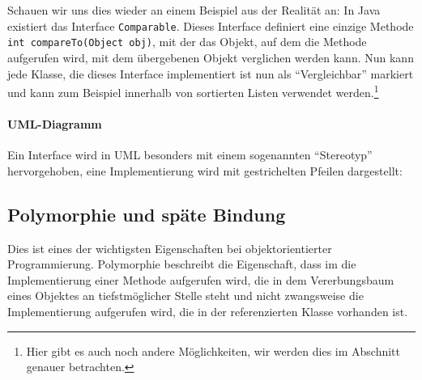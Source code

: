 	Schauen wir uns dies wieder an einem Beispiel aus der Realität an: In Java existiert das Interface \lstinline|Comparable|. Dieses Interface definiert eine einzige Methode \lstinline|int compareTo(Object obj)|, mit der das Objekt, auf dem die Methode aufgerufen wird, mit dem übergebenen Objekt verglichen werden kann. Nun kann jede Klasse, die dieses Interface implementiert ist nun als \enquote{Vergleichbar} markiert und kann zum Beispiel innerhalb von sortierten Listen verwendet werden.\footnote{Hier gibt es auch noch andere Möglichkeiten, wir werden dies im Abschnitt  genauer betrachten.}
	
	\paragraph{UML-Diagramm}
		Ein Interface wird in UML besonders mit einem sogenannten \enquote{Stereotyp} hervorgehoben, eine Implementierung wird mit gestrichelten Pfeilen dargestellt:
		\begin{figure}[H]
			\centering
		\end{figure}

\subsection{Polymorphie und späte Bindung} \imperativeMark \oopMark

	Dies ist eines der wichtigsten Eigenschaften bei objektorientierter Programmierung. Polymorphie beschreibt die Eigenschaft, dass im die Implementierung einer Methode aufgerufen wird, die in dem Vererbungsbaum eines Objektes an tiefstmöglicher Stelle steht und nicht zwangsweise die Implementierung aufgerufen wird, die in der referenzierten Klasse vorhanden ist.
	
